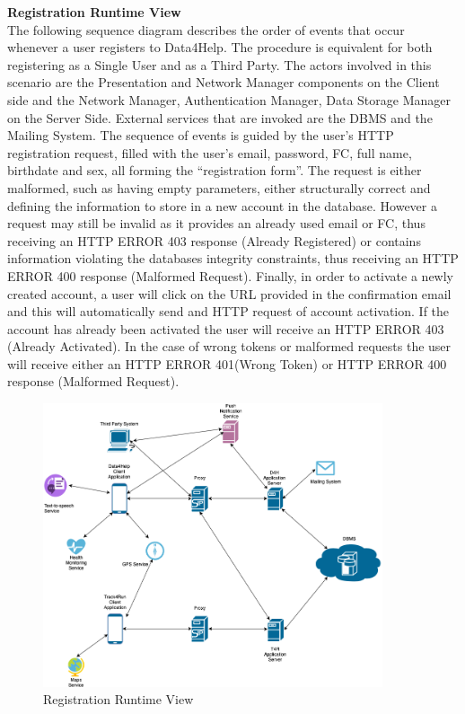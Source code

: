 \documentclass[titlepage]{article}
\begin{document}
{\bf Registration Runtime View }\\ 
The following sequence diagram describes the order of events that occur whenever a user registers to Data4Help. The procedure is equivalent for both registering as a Single User and as a Third Party. The actors involved in this scenario are the Presentation and Network Manager components on the Client side and the Network Manager, Authentication Manager, Data Storage Manager on the Server Side. External services that are invoked are the DBMS and the Mailing System.
The sequence of events is guided by the user’s HTTP registration request, filled with the user’s email, password, FC, full name, birthdate and sex, all forming the “registration form”. The request is either malformed, such as having empty parameters, either structurally correct and defining the information to store in a new account in the database. However a request may still be invalid as it provides an already used email or FC, thus receiving an HTTP ERROR 403 response (Already Registered) or contains information violating the databases integrity constraints, thus receiving an HTTP ERROR 400 response (Malformed Request).
Finally, in order to activate a newly created account, a user will click on the URL provided in the confirmation email and this will automatically send and HTTP request of account activation. If the account has already been activated the user will receive an HTTP ERROR 403 (Already Activated). In the case of wrong tokens or malformed requests the user will receive either an HTTP ERROR 401(Wrong Token) or HTTP ERROR 400 response (Malformed Request).

\begin{figure}[H]
	\center
  	\includegraphics[width=10cm]{Overview.png} %
  	\caption{Registration Runtime View}
 	\label{fig:REG}
\end{figure}
\end{document}
